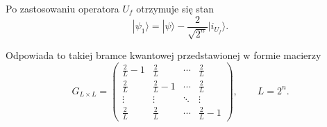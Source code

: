 Po zastosowaniu operatora $U_f$ otrzymuje się stan \cite[s.~163, wz.~(4.72)]{inf_kwant}   
\begin{equation}
\label{eq:diffusion_operator1}
|\psi_1\rangle=|\psi\rangle-\frac{2}{\sqrt{2^n}}|i_{U_f}\rangle.
\end{equation}

Odpowiada to takiej bramce kwantowej przedstawionej w formie macierzy \cite[s.~277, wz.~(5.364)]{inf_kwant}
\begin{equation}
\label{eq:diffusion_matrix} 
G_{L\times L}=
\begin{pmatrix}
\frac2L-1 & \frac2L & \cdots & \frac2L\\
\frac2L & \frac2L-1 & \cdots & \frac2L\\
\vdots & \vdots & \ddots & \vdots\\
\frac2L & \frac2L & \cdots & \frac2L-1
\end{pmatrix},
\qquad
L=2^n.
\end{equation}

